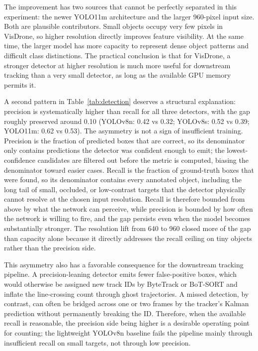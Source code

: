 \documentclass[10pt,twocolumn]{article}
\begin{document}
The improvement has two sources that cannot be perfectly separated in this experiment: the newer YOLO11m architecture and the larger 960-pixel input size. Both are plausible contributors. Small objects occupy very few pixels in VisDrone, so higher resolution directly improves feature visibility. At the same time, the larger model has more capacity to represent dense object patterns and difficult class distinctions. The practical conclusion is that for VisDrone, a stronger detector at higher resolution is much more useful for downstream tracking than a very small detector, as long as the available GPU memory permits it.

A second pattern in Table~\ref{tab:detection} deserves a structural explanation: precision is systematically higher than recall for all three detectors, with the gap roughly preserved around 0.10 (YOLOv8n: 0.42 vs 0.32; YOLOv8s: 0.52 vs 0.39; YOLO11m: 0.62 vs 0.53). The asymmetry is not a sign of insufficient training. Precision is the fraction of predicted boxes that are correct, so its denominator only contains predictions the detector was confident enough to emit; the lowest-confidence candidates are filtered out before the metric is computed, biasing the denominator toward easier cases. Recall is the fraction of ground-truth boxes that were found, so its denominator contains every annotated object, including the long tail of small, occluded, or low-contrast targets that the detector physically cannot resolve at the chosen input resolution. Recall is therefore bounded from above by what the network can perceive, while precision is bounded by how often the network is willing to fire, and the gap persists even when the model becomes substantially stronger. The resolution lift from 640 to 960 closed more of the gap than capacity alone because it directly addresses the recall ceiling on tiny objects rather than the precision side.

This asymmetry also has a favorable consequence for the downstream tracking pipeline. A precision-leaning detector emits fewer false-positive boxes, which would otherwise be assigned new track IDs by ByteTrack or BoT-SORT and inflate the line-crossing count through ghost trajectories. A missed detection, by contrast, can often be bridged across one or two frames by the tracker's Kalman prediction without permanently breaking the ID. Therefore, when the available recall is reasonable, the precision side being higher is a desirable operating point for counting; the lightweight YOLOv8n baseline fails the pipeline mainly through insufficient recall on small targets, not through low precision.
\end{document}
